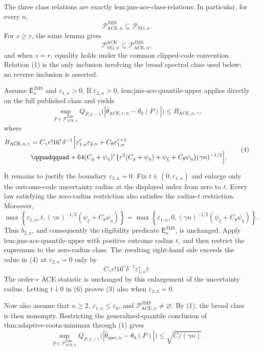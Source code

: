 The three class relations are exactly \(\text{lem:jms-ace-class-relations}\).  In particular, for every \(n\),
\[
 \mathcal P_{\mathrm{ACE},n}^{\mathrm{JMS}}
 \subseteq \mathcal P_{\mathrm{NG},n}.
 \tag{1}
\]
For \(s\ge r\), the same lemma gives
\[
 \mathcal P_{\mathrm{NG},n}^{\mathrm{ACE}}
 \subseteq \mathcal P_{\mathrm{ACE},n}^{\mathrm{JMS}},
 \tag{2}
\]
and when \(s=r\), equality holds under the common clipped-code convention.  Relation (1) is the only inclusion involving the broad spectral class used below; no reverse inclusion is asserted.

Assume \(\mathsf E_n^{\mathrm{JMS}}\) and \(\varepsilon_{1,n}>0\).  If \(\varepsilon_{2,n}>0\), \(\text{lem:jms-ace-quantile-upper}\) applies directly on the full published class and yields
\[
 \sup_{P\in\mathcal P_{\mathrm{ACE},n}^{\mathrm{JMS}}}
 Q_{P,1-\gamma}
 \bigl(|\widehat\theta_{\mathrm{ACE},r,n}-\theta_0(P)|\bigr)
 \le B_{\mathrm{ACE},n,\gamma},
 \tag{3}
\]
where
\[
\begin{aligned}
 B_{\mathrm{ACE},n,\gamma}
 &=C_{\gamma}r!16^r\delta^{-1}
 \Bigl[\varepsilon_{1,n}^r\varepsilon_{2,n}
 +C_{\theta}\varepsilon_{1,n}^{r+1}\\
 &\qquadqquad
 +64(C_g+\psi_{\eta})^r
 \{r^2(C_g+\psi_{\eta})+\psi_{\xi}
      +C_{\theta}\psi_{\eta}\}
 (\gamma n)^{-1/2}\Bigr].
\end{aligned}
\tag{4}
\]

It remains to justify the boundary \(\varepsilon_{2,n}=0\).  Fix \(t\in(0,\varepsilon_{1,n})\) and enlarge only the outcome-code uncertainty radius at the displayed index from zero to \(t\).  Every law satisfying the zero-radius restriction also satisfies the radius-\(t\) restriction.  Moreover,
\[
 \max\!\left\{\varepsilon_{1,n},t,
  (\gamma n)^{-1/2}(\psi_{\xi}+C_{\theta}\psi_{\eta})\right\}
 =
 \max\!\left\{\varepsilon_{1,n},0,
  (\gamma n)^{-1/2}(\psi_{\xi}+C_{\theta}\psi_{\eta})\right\}.
 \tag{5}
\]
Thus \(b_{2,n}\), and consequently the eligibility predicate \(\mathsf E_n^{\mathrm{JMS}}\), is unchanged.  Apply \(\text{lem:jms-ace-quantile-upper}\) with positive outcome radius \(t\), and then restrict the supremum to the zero-radius class.  The resulting right-hand side exceeds the value in (4) at \(\varepsilon_{2,n}=0\) only by
\[
 C_{\gamma}r!16^r\delta^{-1}\varepsilon_{1,n}^rt.
 \tag{6}
\]
The order-\(r\) ACE statistic is unchanged by this enlargement of the uncertainty radius.  Letting \(t\downarrow0\) in (6) proves (3) also when \(\varepsilon_{2,n}=0\).

Now also assume that \(n\ge2\), \(\varepsilon_{1,n}\le\varepsilon_0\), and \(\mathcal P_{\mathrm{ACE},n}^{\mathrm{JMS}}\neq\varnothing\).  By (1), the broad class is then nonempty.  Restricting the generalized-quantile conclusion of \(\text{thm:adaptive-rootn-minimax}\) through (1) gives
\[
 \sup_{P\in\mathcal P_{\mathrm{ACE},n}^{\mathrm{JMS}}}
 Q_{P,1-\gamma}
 \bigl(|\widehat\theta_{\mathrm{spec},n}-\theta_0(P)|\bigr)
 \le\sqrt{C/(\gamma n)}.
 \tag{7}
\]

